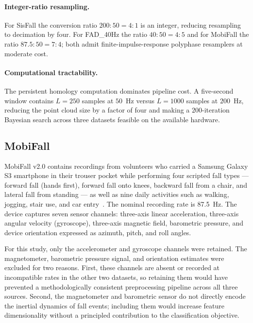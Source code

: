\documentclass[onluarkali,ingilizce,yukseklisans,karton,LisansustuEgitim]{itutez}
\providecommand{\1}{\mathbf{1}}
\begin{document}
\paragraph{Integer-ratio resampling.} For SisFall the conversion ratio $200{:}50=4{:}1$ is an integer, reducing resampling to decimation by four. For FAD\_40Hz the ratio $40{:}50=4{:}5$ and for MobiFall the ratio $87.5{:}50=7{:}4$; both admit finite-impulse-response polyphase resamplers at moderate cost.

\paragraph{Computational tractability.} The persistent homology computation dominates pipeline cost. A five-second window contains $L=250$ samples at $50$~Hz versus $L=1000$ samples at $200$~Hz, reducing the point cloud size by a factor of four and making a $200$-iteration Bayesian search across three datasets feasible on the available hardware.

\subsection{MobiFall}
\label{subsubsec:mobifall}

MobiFall v2.0 contains recordings from volunteers who carried a Samsung Galaxy S3 smartphone in their trouser pocket while performing four scripted fall types --- forward fall (hands first), forward fall onto knees, backward fall from a chair, and lateral fall from standing --- as well as nine daily activities such as walking, jogging, stair use, and car entry~\parencite{mobifall}. The nominal recording rate is 87.5~Hz. The device captures seven sensor channels: three-axis linear acceleration, three-axis angular velocity (gyroscope), three-axis magnetic field, barometric pressure, and device orientation expressed as azimuth, pitch, and roll angles.

For this study, only the accelerometer and gyroscope channels were retained. The magnetometer, barometric pressure signal, and orientation estimates were excluded for two reasons. First, these channels are absent or recorded at incompatible rates in the other two datasets, so retaining them would have prevented a methodologically consistent preprocessing pipeline across all three sources. Second, the magnetometer and barometric sensor do not directly encode the inertial dynamics of fall events; including them would increase feature dimensionality without a principled contribution to the classification objective.
\end{document}
